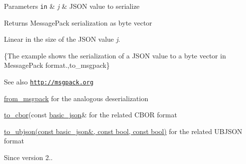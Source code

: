 \begin{DoxyParams}[1]{Parameters}
\mbox{\tt in}  & {\em j} & J\+S\+ON value to serialize \\
\hline
\end{DoxyParams}
\begin{DoxyReturn}{Returns}
Message\+Pack serialization as byte vector
\end{DoxyReturn}
Linear in the size of the J\+S\+ON value {\itshape j}.

\{The example shows the serialization of a J\+S\+ON value to a byte vector in Message\+Pack format.,to\+\_\+msgpack\}

\begin{DoxySeeAlso}{See also}
\href{http://msgpack.org}{\tt http\+://msgpack.\+org} 

\hyperlink{classnlohmann_1_1basic__json_a11458b7982adba51bc634f2f8c961e9b}{from\+\_\+msgpack} for the analogous deserialization 

\hyperlink{classnlohmann_1_1basic__json_a2566783e190dec524bf3445b322873b8}{to\+\_\+cbor}(const \hyperlink{classnlohmann_1_1basic__json}{basic\+\_\+json}\& for the related C\+B\+OR format 

\hyperlink{classnlohmann_1_1basic__json_ae1ece6c2059114eac10873f13ef19185}{to\+\_\+ubjson(const basic\+\_\+json\&, const bool, const bool)} for the related U\+B\+J\+S\+ON format
\end{DoxySeeAlso}
\begin{DoxySince}{Since}
version 2.. 
\end{DoxySince}
